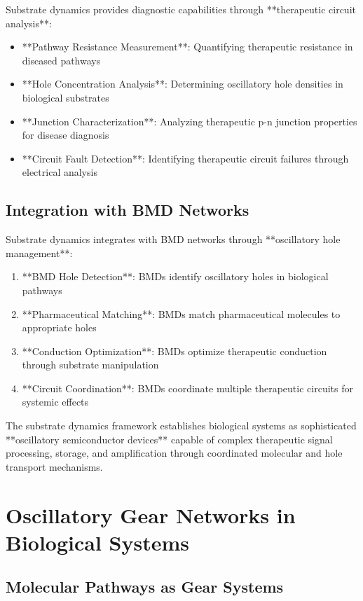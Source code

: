 \documentclass[12pt,a4paper]{article}
\begin{document}
Substrate dynamics provides diagnostic capabilities through **therapeutic circuit analysis**:

\begin{itemize}
\item **Pathway Resistance Measurement**: Quantifying therapeutic resistance in diseased pathways
\item **Hole Concentration Analysis**: Determining oscillatory hole densities in biological substrates
\item **Junction Characterization**: Analyzing therapeutic p-n junction properties for disease diagnosis
\item **Circuit Fault Detection**: Identifying therapeutic circuit failures through electrical analysis
\end{itemize}

\subsection{Integration with BMD Networks}

Substrate dynamics integrates with BMD networks through **oscillatory hole management**:

\begin{enumerate}
\item **BMD Hole Detection**: BMDs identify oscillatory holes in biological pathways
\item **Pharmaceutical Matching**: BMDs match pharmaceutical molecules to appropriate holes
\item **Conduction Optimization**: BMDs optimize therapeutic conduction through substrate manipulation
\item **Circuit Coordination**: BMDs coordinate multiple therapeutic circuits for systemic effects
\end{enumerate}

The substrate dynamics framework establishes biological systems as sophisticated **oscillatory semiconductor devices** capable of complex therapeutic signal processing, storage, and amplification through coordinated molecular and hole transport mechanisms.

\section{Oscillatory Gear Networks in Biological Systems}

\subsection{Molecular Pathways as Gear Systems}
\end{document}
